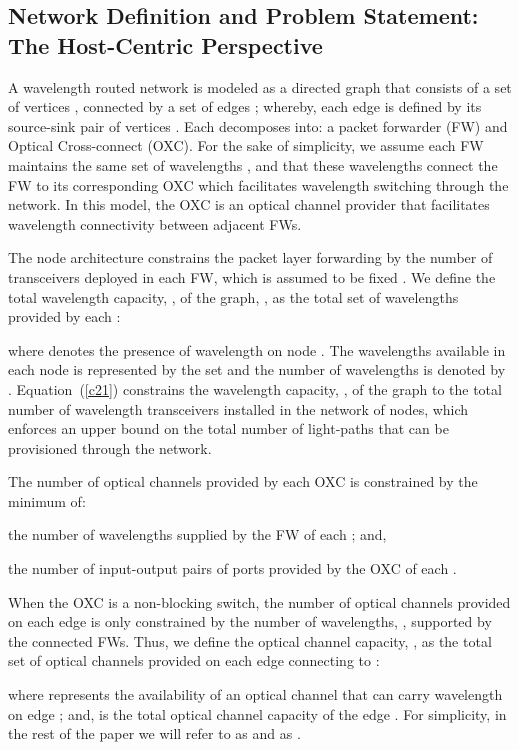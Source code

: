 \documentclass[journal]{IEEEtran}
\begin{document}
\subsection{Network Definition and Problem Statement: The Host-Centric Perspective}
A wavelength routed network is modeled as a directed graph 
that consists of a set of vertices ,
connected by a set of edges ; whereby, each edge  is defined by its
source-sink pair of vertices . Each  decomposes
into: a packet forwarder (FW) and Optical Cross-connect (OXC). For
the sake of simplicity, we assume each FW maintains the same set of
wavelengths , and that these
wavelengths connect the FW to its corresponding OXC which facilitates wavelength switching through the network. In this model, the OXC is an optical channel provider that facilitates wavelength connectivity between adjacent FWs.

The node architecture constrains the packet layer forwarding by the
number of transceivers deployed in each FW, which is assumed to be
fixed . We define the total wavelength
capacity, , of the graph, , as the total set of wavelengths provided by each :

where  denotes the presence of wavelength 
on node . The wavelengths available in each node is represented
by the set  and the number of wavelengths is denoted by .
Equation~(\ref{c21}) constrains the wavelength capacity, , of the
graph to the total number of wavelength transceivers installed in the
network of  nodes, which enforces an upper bound on the total number of light-paths that can be provisioned through the network. 

The number of optical channels provided by each OXC is constrained by the minimum of: 
\begin{inparaenum}
\item the number of wavelengths supplied by the FW of each ; and,
\item the number of input-output pairs of ports provided by the OXC of each .
\end{inparaenum}
When the OXC is a non-blocking switch, the number of optical channels provided on each edge  is only constrained by the number of wavelengths, , supported by the connected FWs.
Thus, we define the optical channel capacity, , as the total set of optical channels provided on each edge  connecting  to :

where  represents the availability
of an optical channel that can carry wavelength  on edge ; and,  is the
total optical channel capacity of the edge . For simplicity, in the rest of the paper we will refer to  as  and  as .
\end{document}
